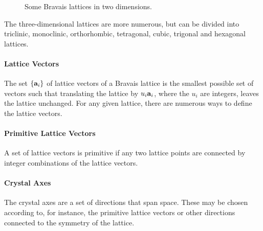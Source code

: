 \begin{figure}[!ht]
	\centering
	\hfil
	\caption{Some Bravais lattices in two dimensions.}
	\label{fig:bravais2D}
\end{figure}

The three-dimensional lattices are more numerous, but can be divided into triclinic, monoclinic, orthorhombic, tetragonal, cubic, trigonal and hexagonal lattices.


\paragraph{Lattice Vectors}
The set $\{\vb{a}_{i}\}$ of lattice vectors of a Bravais lattice is the smallest possible set of vectors such that translating the lattice by $u_{i}\vb{a}_{i}$, where the $u_{i}$ are integers, leaves the lattice unchanged. For any given lattice, there are numerous ways to define the lattice vectors.

\paragraph{Primitive Lattice Vectors}
A set of lattice vectors is primitive if any two lattice points are connected by integer combinations of the lattice vectors.

\paragraph{Crystal Axes}
The crystal axes are a set of directions that span space. These may be chosen according to, for instance, the primitive lattice vectors or other directions connected to the symmetry of the lattice.

